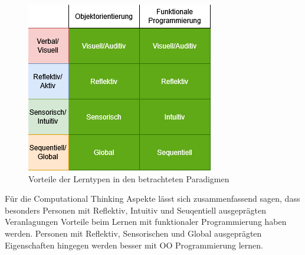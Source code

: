 \begin{figure}[h!]
    \centering
    \includegraphics[width=1\linewidth]{Figures/Styles_Paradigms}
    \caption{Vorteile der Lerntypen in den betrachteten Paradigmen}
\end{figure}

Für die Computational Thinking Aspekte lässt sich zusammenfassend sagen, dass besonders Personen mit Reflektiv, Intuitiv und Seuqentiell ausgeprägten Veranlagungen Vorteile beim Lernen mit funktionaler Programmierung haben werden. Personen mit Reflektiv, Sensorischen und Global ausgeprägten Eigenschaften hingegen werden besser mit OO Programmierung lernen.